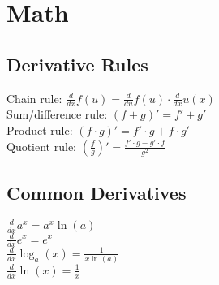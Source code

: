 \section{Math}
\subsection*{Derivative Rules}
Chain rule: $\frac{d}{dx} f(u) = \frac{d}{du} f(u) \cdot \frac{d}{dx} u(x)$\\
Sum/difference rule: $(f \pm g)' = f' \pm g'$\\
Product rule: $(f \cdot g)' = f' \cdot g + f \cdot g'$\\
Quotient rule: $(\frac{f}{g})' = \frac{f' \cdot g - g' \cdot f}{g^2}$\\
\subsection*{Common Derivatives}
$\frac{d}{dx} a^x = a^x \ln(a)$\\
$\frac{d}{dx} e^x = e^x$\\
$\frac{d}{dx} \log_a(x) = \frac{1}{x \ln(a)}$\\
$\frac{d}{dx} \ln(x) = \frac{1}{x}$\\
